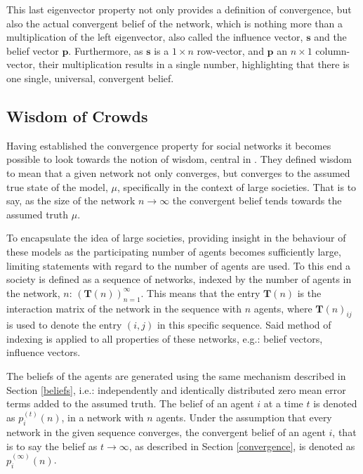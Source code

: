 \documentclass[a4paper, 12pt]{report}
\newcommand{\T}{\bm{T}}
\newcommand{\Soc}{(\T(n))^{\infty}_{n=1}}
\newcommand{\beli}[3][2]{p_{#2}^{(#3)}}
\begin{document}
 \noindent This last eigenvector property not only provides a definition of convergence, but also the actual convergent belief of the network, which is nothing more than a multiplication of the left eigenvector, also called the influence vector, $\bm{s}$ and the belief vector $\bm{p}$. Furthermore, as $\bm{s}$ is a $1 \times n$ row-vector, and $\bm{p}$ an $n \times 1$ column-vector, their multiplication results in a single number, highlighting that there is one single, universal, convergent belief.

\newpage

\subsection{Wisdom of Crowds}
\label{wisdom}
Having established the convergence property for social networks it becomes possible to look towards the notion of wisdom, central in \parencite{golub2010naive}. They defined wisdom to mean that a given network not only converges, but converges to the assumed true state of the model, $\mu$, specifically in the context of large societies. That is to say, as the size of the network $n\to\infty$ the convergent belief tends towards the assumed truth $\mu$.

\noindent To encapsulate the idea of large societies, providing insight in the behaviour of these models as the participating number of agents becomes sufficiently large, limiting statements with regard to the number of agents are used. To this end a society is defined as a sequence of networks, indexed by the number of agents in the network, $n$: $\Soc$. This means that the entry $\textbf{T}(n)$ is the interaction matrix of the network in the sequence with $n$ agents, where $\textbf{T}(n)_{ij}$ is used to denote the entry $(i,j)$ in this specific sequence. Said method of indexing is applied to all properties of these networks, e.g.: belief vectors, influence vectors.

\noindent The beliefs of the agents are generated using the same mechanism described in Section \ref{beliefs}, i.e.: independently and identically distributed zero mean error terms added to the assumed truth. The belief of an agent $i$ at a time $t$ is denoted as $\beli{i}{t}(n)$, in a network with $n$ agents. Under the assumption that every network in the given sequence converges, the convergent belief of an agent $i$, that is to say the belief as $t \to\infty$, as described in Section \ref{convergence}, is denoted as $\beli{i}{\infty}(n)$.
\end{document}
